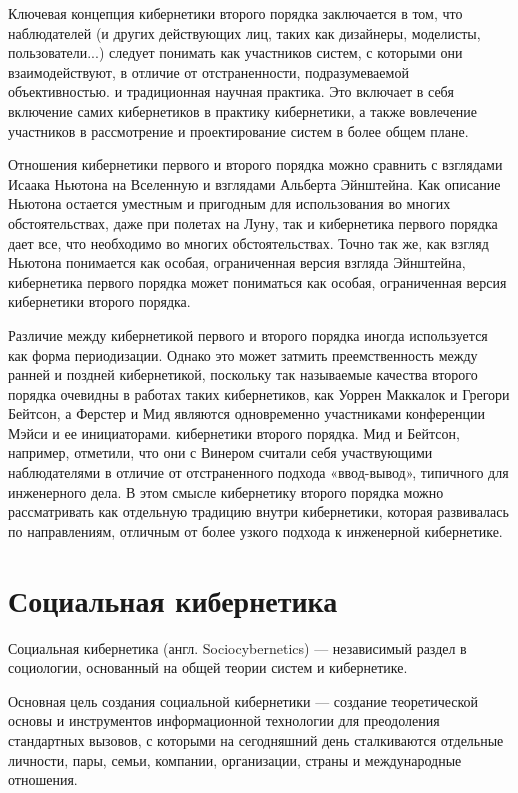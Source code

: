 \documentclass[a4page]{article}
\begin{document}
Ключевая концепция кибернетики второго порядка заключается в том, что наблюдателей (и других действующих лиц, таких как дизайнеры, моделисты, пользователи...) следует понимать как участников систем, с которыми они взаимодействуют, в отличие от отстраненности, подразумеваемой объективностью. и традиционная научная практика. Это включает в себя включение самих кибернетиков в практику кибернетики, а также вовлечение участников в рассмотрение и проектирование систем в более общем плане.

Отношения кибернетики первого и второго порядка можно сравнить с взглядами Исаака Ньютона на Вселенную и взглядами Альберта Эйнштейна\cite{cybernetics_of_cybernetics}. Как описание Ньютона остается уместным и пригодным для использования во многих обстоятельствах, даже при полетах на Луну, так и кибернетика первого порядка дает все, что необходимо во многих обстоятельствах. Точно так же, как взгляд Ньютона понимается как особая, ограниченная версия взгляда Эйнштейна, кибернетика первого порядка может пониматься как особая, ограниченная версия кибернетики второго порядка.

Различие между кибернетикой первого и второго порядка иногда используется как форма периодизации. Однако это может затмить преемственность между ранней и поздней кибернетикой, поскольку так называемые качества второго порядка очевидны в работах таких кибернетиков, как Уоррен Маккалок и Грегори Бейтсон, а Ферстер и Мид являются одновременно участниками конференции Мэйси и ее инициаторами. кибернетики второго порядка. Мид и Бейтсон, например, отметили, что они с Винером считали себя участвующими наблюдателями в отличие от отстраненного подхода «ввод-вывод», типичного для инженерного дела. В этом смысле кибернетику второго порядка можно рассматривать как отдельную традицию внутри кибернетики, которая развивалась по направлениям, отличным от более узкого подхода к инженерной кибернетике.

\newpage
\section{Социальная кибернетика}
Социальная кибернетика (англ. Sociocybernetics) — независимый раздел в социологии, основанный на общей теории систем и кибернетике\cite{ruwiki:sociocybernetics}.

Основная цель создания социальной кибернетики — создание теоретической основы и инструментов информационной технологии для преодоления стандартных вызовов, с которыми на сегодняшний день сталкиваются отдельные личности, пары, семьи, компании, организации, страны и международные отношения.
\end{document}
